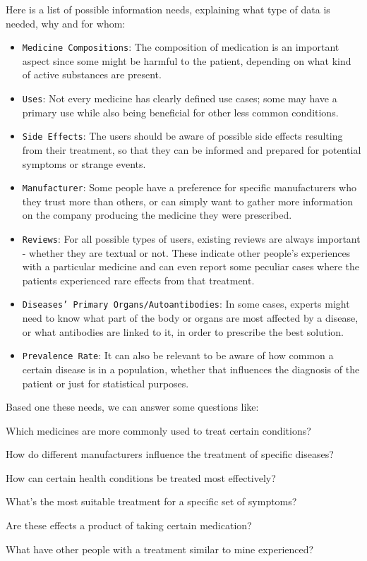 \documentclass[sigconf]{acmart}
\begin{document}
Here is a list of possible information needs, explaining what type of data is needed, why and for whom:
\begin{itemize}
	\item {\texttt{Medicine Compositions}}: The composition of medication is an important aspect since some might be harmful to the patient, depending on what kind of active substances are present.
	\item {\texttt{Uses}}: Not every medicine has clearly defined use cases; some may have a primary use while also being beneficial for other less common conditions.
	\item {\texttt{Side Effects}}: The users should be aware of possible side effects resulting from their treatment, so that they can be informed and prepared for potential symptoms or strange events.
	\item {\texttt{Manufacturer}}: Some people have a preference for specific manufacturers who they trust more than others, or can simply want to gather more information on the company producing the medicine they were prescribed.
	\item {\texttt{Reviews}}: For all possible types of users, existing reviews are always important - whether they are textual or not. These indicate other people's experiences with a particular medicine and can even report some peculiar cases where the patients experienced rare effects from that treatment.
	\item {\texttt{Diseases' Primary Organs/Autoantibodies}}: In some cases, experts might need to know what part of the body or organs are most affected by a disease, or what antibodies are linked to it, in order to prescribe the best solution.
	\item {\texttt{Prevalence Rate}}: It can also be relevant to be aware of how common a certain disease is in a population, whether that influences the diagnosis of the patient or just for statistical purposes.
\end{itemize}

Based one these needs, we can answer some questions like: 
\begin{arrowlist}
	\item Which medicines are more commonly used to treat certain conditions?
	\item How do different manufacturers influence the treatment of specific diseases?
	\item How can certain health conditions be treated most effectively?
	\item What's the most suitable treatment for a specific set of symptoms?
	\item Are these effects a product of taking certain medication?
	\item What have other people with a treatment similar to mine experienced?
\end{arrowlist}
\end{document}
